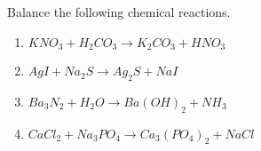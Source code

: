 \begin{enumialphparenastyle}

\begin{ex}
 Balance the following chemical reactions. 

\begin{enumerate}
\item $KNO_{3}+H_{2}CO_{3}\rightarrow K_{2}CO_{3}+HNO_{3}$

\item $AgI+Na_{2}S\rightarrow Ag_{2}S+NaI$

\item $Ba_{3}N_{2}+H_{2}O\rightarrow Ba\left( OH\right) _{2}+NH_{3}$

\item $CaCl_{2}+Na_{3}PO_{4}\rightarrow Ca_{3}\left( PO_{4}\right) _{2}+NaCl$
\end{enumerate}
\end{ex}

\end{enumialphparenastyle}